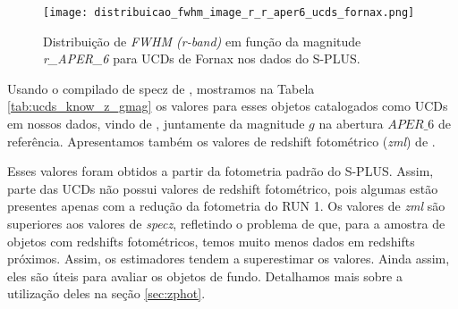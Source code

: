 \begin{figure}[!ht]
    \centering
    \texttt{[image: distribuicao\_fwhm\_image\_r\_r\_aper6\_ucds\_fornax.png]}
    \caption[]{Distribuição de \textit{FWHM (r-band)} em função da magnitude \textit{r\_APER\_6} para UCDs de Fornax nos dados do S-PLUS.}
    \label{distribuicao_fwhm_image_r_r_aper6_ucds_fornax}
\end{figure}

Usando o compilado de \ac{specz} de \cite{Lima_2024}, mostramos na Tabela \ref{tab:ucds_know_z_gmag} os valores para esses objetos catalogados como UCDs em nossos dados, vindo de \cite{catalog_ucds}, juntamente da magnitude $g$ na abertura $APER\_6$ de referência. Apresentamos também os valores de redshift fotométrico (\textit{zml}) de \citep{erik_photoz_2024}. 

Esses valores foram obtidos a partir da fotometria padrão do S-PLUS. Assim, parte das UCDs não possui valores de redshift fotométrico, pois algumas estão presentes apenas com a redução da fotometria do RUN 1. Os valores de \textit{zml} são superiores aos valores de \textit{specz}, refletindo o problema de que, para a amostra de objetos com redshifts fotométricos, temos muito menos dados em redshifts próximos. Assim, os estimadores tendem a superestimar os valores. Ainda assim, eles são úteis para avaliar os objetos de fundo. Detalhamos mais sobre a utilização deles na seção \ref{sec:zphot}.

